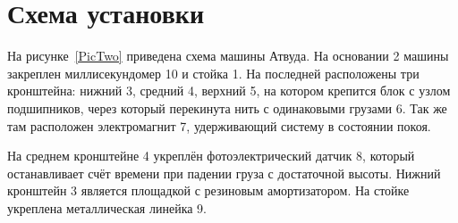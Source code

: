 \section{Схема установки}
На рисунке~\ref{PicTwo} приведена схема машины Атвуда. На основании 2 машины закреплен миллисекундомер 10 и стойка 1. На последней расположены три кронштейна: нижний 3, средний 4, верхний 5, на котором крепится блок с узлом подшипников, через который перекинута нить с одинаковыми грузами 6. Так же там расположен электромагнит 7, удерживающий систему в состоянии покоя.

На среднем кронштейне 4 укреплён фотоэлектрический датчик 8, который останавливает счёт времени при падении груза с достаточной высоты. Нижний кронштейн 3 является площадкой с резиновым амортизатором. На стойке укреплена металлическая линейка 9.